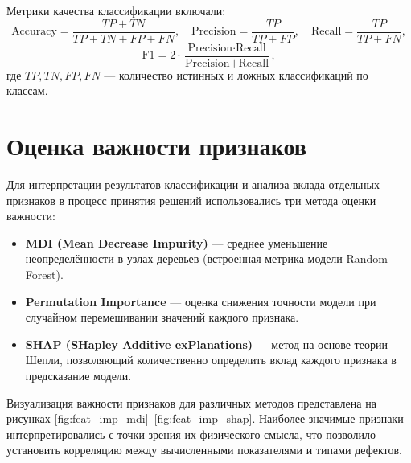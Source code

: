 Метрики качества классификации включали:
\[
\text{Accuracy} = \frac{TP + TN}{TP + TN + FP + FN}, \quad
\text{Precision} = \frac{TP}{TP + FP}, \quad
\text{Recall} = \frac{TP}{TP + FN},
\]
\[
\text{F1} = 2 \cdot \frac{\text{Precision} \cdot \text{Recall}}{\text{Precision} + \text{Recall}},
\]
где \( TP, TN, FP, FN \) — количество истинных и ложных классификаций по классам.

\section{Оценка важности признаков}

Для интерпретации результатов классификации и анализа вклада отдельных признаков в процесс принятия решений использовались три метода оценки важности:

\begin{itemize}
    \item \textbf{MDI (Mean Decrease Impurity)} — среднее уменьшение неопределённости в узлах деревьев (встроенная метрика модели Random Forest).
    \item \textbf{Permutation Importance} — оценка снижения точности модели при случайном перемешивании значений каждого признака.
    \item \textbf{SHAP (SHapley Additive exPlanations)} — метод на основе теории Шепли, позволяющий количественно определить вклад каждого признака в предсказание модели.
\end{itemize}

Визуализация важности признаков для различных методов представлена на рисунках \ref{fig:feat_imp_mdi}–\ref{fig:feat_imp_shap}.  
Наиболее значимые признаки интерпретировались с точки зрения их физического смысла, что позволило установить корреляцию между вычисленными показателями и типами дефектов.

%
%

